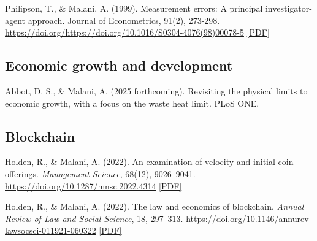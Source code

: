 \begin{tablist}
        \item[1999] \tab{}Philipson, T., \& Malani, A. (1999). Measurement errors: A principal investigator-agent approach. Journal of Econometrics, 91(2), 273-298. \href{https://doi.org/https://doi.org/10.1016/S0304-4076(98)00078-5}{https://doi.org/https://doi.org/10.1016/S0304-4076(98)00078-5} \href{https://github.com/anup-malani/website_personal/blob/main/publications/1999_PhilipsonMalani_MeasurementErrors.pdf}{[PDF]}
        
    \end{tablist}

    \subsection*{Economic growth and development}

    \begin{tablist}

        \item[2025] \tab{}Abbot, D. S., \& Malani, A. (2025 forthcoming). Revisiting the physical limits to economic growth, with a focus on the waste heat limit. PLoS ONE. 

    \end{tablist}

    \subsection*{Blockchain}

    \begin{tablist}

        \item[2022] \tab{}Holden, R., \& Malani, A. (2022). An examination of velocity and initial coin offerings. \textit{Management Science}, 68(12), 9026–9041. \href{https://doi.org/10.1287/mnsc.2022.4314}{https://doi.org/10.1287/mnsc.2022.4314} \href{https://github.com/anup-malani/website_personal/blob/main/publications/2022_HoldenMalani_ManagementScience_VelocityICO.pdf}{[PDF]}
        
        \item[2022] \tab{}Holden, R., \& Malani, A. (2022). The law and economics of blockchain. \textit{Annual Review of Law and Social Science}, 18, 297–313. \href{https://doi.org/10.1146/annurev-lawsocsci-011921-060322}{https://doi.org/10.1146/annurev-lawsocsci-011921-060322} \href{https://github.com/anup-malani/website_personal/blob/main/publications/2022_HoldenMalani_AnnualReview_LawEconomicsBlockchain.pdf}{[PDF]}
                
    \end{tablist}

